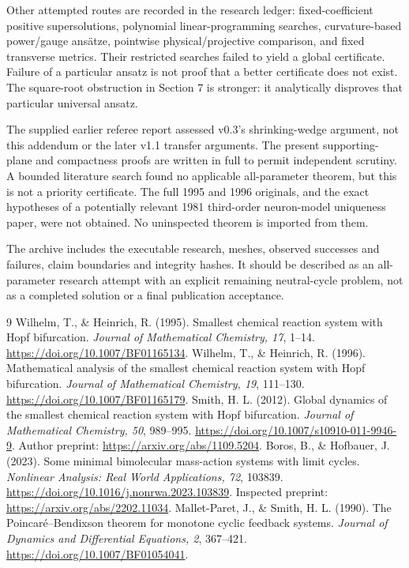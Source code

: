 \documentclass[11pt,a4paper]{article}
\theoremstyle{remark}\newtheorem{remark}[theorem]{Remark}
\begin{document}
Other attempted routes are recorded in the research ledger: fixed-coefficient positive supersolutions, polynomial linear-programming searches, curvature-based power/gauge ans\"atze, pointwise physical/projective comparison, and fixed transverse metrics. Their restricted searches failed to yield a global certificate. Failure of a particular ansatz is not proof that a better certificate does not exist. The square-root obstruction in Section 7 is stronger: it analytically disproves that particular universal ansatz.

The supplied earlier referee report assessed v0.3's shrinking-wedge argument, not this addendum or the later v1.1 transfer arguments. The present supporting-plane and compactness proofs are written in full to permit independent scrutiny. A bounded literature search found no applicable all-parameter theorem, but this is not a priority certificate. The full 1995 and 1996 originals, and the exact hypotheses of a potentially relevant 1981 third-order neuron-model uniqueness paper, were not obtained. No uninspected theorem is imported from them.

The archive includes the executable research, meshes, observed successes and failures, claim boundaries and integrity hashes. It should be described as an all-parameter research attempt with an explicit remaining neutral-cycle problem, not as a completed solution or a final publication acceptance.

\begin{thebibliography}{9}
 Wilhelm, T., \& Heinrich, R. (1995). Smallest chemical reaction system with Hopf bifurcation. \emph{Journal of Mathematical Chemistry, 17}, 1--14. \url{https://doi.org/10.1007/BF01165134}.
 Wilhelm, T., \& Heinrich, R. (1996). Mathematical analysis of the smallest chemical reaction system with Hopf bifurcation. \emph{Journal of Mathematical Chemistry, 19}, 111--130. \url{https://doi.org/10.1007/BF01165179}.
 Smith, H. L. (2012). Global dynamics of the smallest chemical reaction system with Hopf bifurcation. \emph{Journal of Mathematical Chemistry, 50}, 989--995. \url{https://doi.org/10.1007/s10910-011-9946-9}. Author preprint: \url{https://arxiv.org/abs/1109.5204}.
 Boros, B., \& Hofbauer, J. (2023). Some minimal bimolecular mass-action systems with limit cycles. \emph{Nonlinear Analysis: Real World Applications, 72}, 103839. \url{https://doi.org/10.1016/j.nonrwa.2023.103839}. Inspected preprint: \url{https://arxiv.org/abs/2202.11034}.
 Mallet-Paret, J., \& Smith, H. L. (1990). The Poincar\'e--Bendixson theorem for monotone cyclic feedback systems. \emph{Journal of Dynamics and Differential Equations, 2}, 367--421. \url{https://doi.org/10.1007/BF01054041}.
\end{thebibliography}
\end{document}
